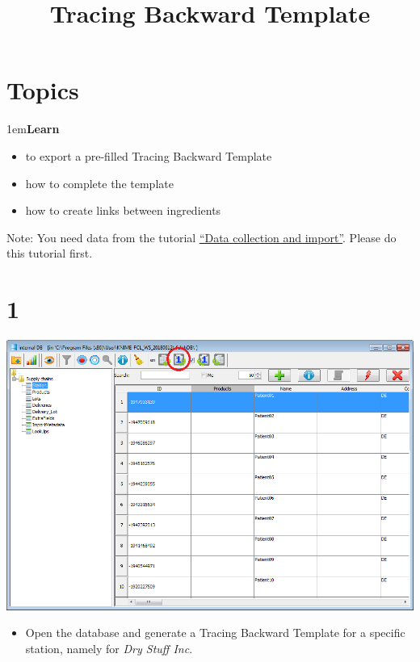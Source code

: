 \documentclass[10pt]{beamer}
\title{Tracing Backward Template}
\date{}
\begin{document}
\maketitle

\section{Topics}
\begin{frame}
\leftskip1em\textbf{Learn}
	\begin{itemize}
		\item to export a pre-filled Tracing Backward Template
		\item how to complete the template
		\item how to create links between ingredients
	\end{itemize}
\vspace*{\fill}
Note: You need data from the tutorial \textcolor{blue}{\underline{\href{https://foodrisklabs.bfr.bund.de/data-collection-and-import/}{``Data collection and import''}}}. Please do this tutorial first.
\end{frame}

\section{1}
\begin{frame}
	\begin{center}
			\includegraphics[height=0.6\textheight]{1.png}
	\end{center}
	\begin{itemize}
		\item Open the database and generate a Tracing Backward Template for a specific station, namely for \textit{Dry Stuff Inc}.
	\end{itemize}
\end{frame}
\end{document}
